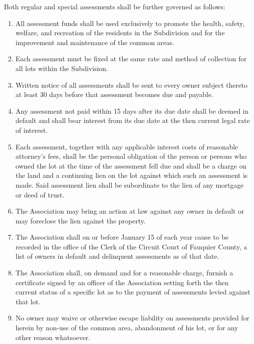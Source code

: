 \documentclass[12pt, letterpaper]{article}
\begin{document}
\begin{enumerate}
Both regular and special assessments shall be further governed as follows:
 \begin{enumerate}
 \item All assessment funds shall be used exclusively to promote the health, safety, welfare, and recreation of the residents in the Subdivision and for the improvement and maintenance of the common areas.
 \item Each assessment must be fixed at the same rate and method of collection for all lots within the Subdivision.
 \item Written notice of all assessments shall be sent to every owner subject thereto at least 30 days before that assessment becomes due and payable.
 \item Any assessment not paid within 15 days after its due date shall be deemed in default and shall bear interest from its due date at the then current legal rate of interest.
 \item Each assessment, together with any applicable interest costs of reasonable attorney's fees, shall be the personal obligation of the person or persons who owned the lot at the time of the assessment fell due and shall be a charge on the land and a continuing lien on the lot against which such an assessment is made.
 Said assessment lien shall be subordinate to the lien of any mortgage or deed of trust.
 \item The Association may bring an action at law against any owner in default or may foreclose the lien against the property.
 \item The Association shall on or before January 15 of each year cause to be recorded in the office of the Clerk of the Circuit Court of Fauquier County, a list of owners in default and delinquent assessments as of that date.
 \item The Association shall, on demand and for a reasonable charge, furnish a certificate signed by an officer of the Association setting forth the then current status of a specific lot as to the payment of assessments levied against that lot.
 \item No owner may waive or otherwise escape liability on assessments provided for herein by non-use of the common area, abandonment of his lot, or for any other reason whatsoever.
 \end{enumerate}
\end{enumerate}
\end{document}
